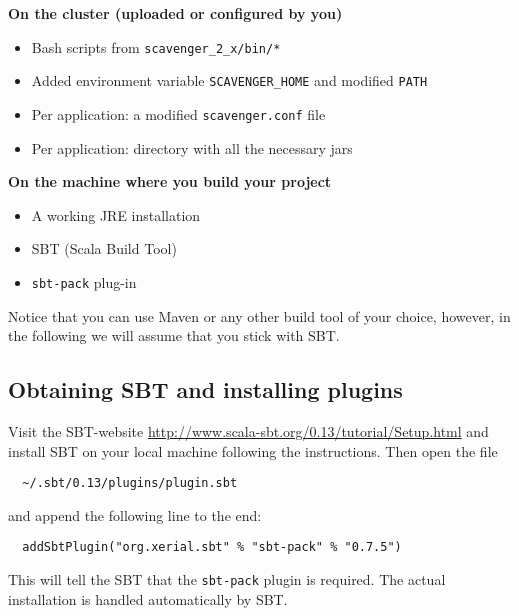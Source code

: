 \documentclass{scrbook}
\begin{document}
\noindent\textbf{On the cluster (uploaded or configured by you)}
\begin{itemize}
  \item Bash scripts from \lstinline{scavenger_2_x/bin/*}
  \item Added environment variable \lstinline{SCAVENGER_HOME} and modified 
    \lstinline{PATH}
  \item Per application: a modified \lstinline{scavenger.conf} file 
  \item Per application: directory with all the necessary jars
\end{itemize}

\noindent\textbf{On the machine where you build your project}
\begin{itemize}
  \item A working JRE installation 
  \item SBT (Scala Build Tool)
  \item \lstinline{sbt-pack} plug-in
\end{itemize}

Notice that you can use Maven or any other build tool of your choice, however,
in the following we will assume that you stick with SBT.

\subsection{Obtaining SBT and installing plugins}
Visit the SBT-website \url{http://www.scala-sbt.org/0.13/tutorial/Setup.html} and install SBT on your local machine following the instructions.
Then open the file 
\begin{lstlisting}
  ~/.sbt/0.13/plugins/plugin.sbt
\end{lstlisting} 
and append the following line to the end:
\begin{lstlisting}
  addSbtPlugin("org.xerial.sbt" % "sbt-pack" % "0.7.5")
\end{lstlisting}
This will tell the SBT that the \lstinline{sbt-pack} plugin is 
required. The actual installation is handled automatically by SBT.
\end{document}
